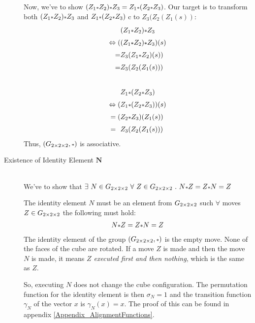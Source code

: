 \begin{description}
Now, we've to show $(Z_1 \mathlarger{\scriptstyle*} Z_2) \mathlarger{\scriptstyle*} Z_3 = Z_1 \mathlarger{\scriptstyle*} (Z_2 \mathlarger{\scriptstyle*} Z_3)$. Our target is to transform both $(Z_1 \mathlarger{\scriptstyle*} Z_2) \mathlarger{\scriptstyle*} Z_3$ and $Z_1 \mathlarger{\scriptstyle*} (Z_2 \mathlarger{\scriptstyle*} Z_3)$ c to $Z_3(Z_2(Z_1(s))$:
\begin{align*}
& (Z_1 \mathlarger{\scriptstyle*} Z_2) \mathlarger{\scriptstyle*} Z_3 \\
\Leftrightarrow (&(Z_1 \mathlarger{\scriptstyle*} Z_2) \mathlarger{\scriptstyle*} Z_3)(s) \\
= & Z_3(Z_1 \mathlarger{\scriptstyle*} Z_2)(s)) \\
= & Z_3(Z_2(Z_1(s)))
\\
\\
&Z_1 \mathlarger{\scriptstyle*} (Z_2 \mathlarger{\scriptstyle*} Z_3) \\
\Leftrightarrow (&Z_1 \mathlarger{\scriptstyle*} (Z_2 \mathlarger{\scriptstyle*} Z_3))(s) \\
= (&Z_2 \mathlarger{\scriptstyle*} Z_3)(Z_1(s)) \\
= \ \ & Z_3(Z_2(Z_1(s)))
\end{align*}
Thus, $(\Gtwo, \mathlarger{\scriptstyle*})$ is associative.


\item [Existence of  Identity Element $\boldsymbol{N}$] \ \\

We've to show that $\exists \ N \in \Gtwo \ \forall \ Z \in \Gtwo \ . \ N \mathlarger{\scriptstyle*} Z = Z \mathlarger{\scriptstyle*} N = Z$


The identity element $N$ must be an element from $G_{2\times 2\times 2}$ such $\forall$ moves $Z \in G_{2\times 2\times 2}$ the following must hold:
\begin{align*}
N \mathlarger{\scriptstyle*} Z = Z \mathlarger{\scriptstyle*} N = Z
\end{align*}
The identity element of the group $(\Gtwo, \mathlarger{\scriptstyle*})$ is the empty move. None of the faces of the cube are rotated. If a move $Z$ is made and then the move $N$ is made, it means \textit{ $Z$ executed first and then nothing}, which is the same as \textit{ $Z$}.

So, executing $N$ does not change the cube configuration. The permutation function for the identity element is then $\sigma_N=1$ and the transition function $\gamma_N$ of the vector $x$ is $\gamma_N(x)=x$. The proof of this can be found in appendix \ref{Appendix_AlignmentFunctions}.


\end{description}
